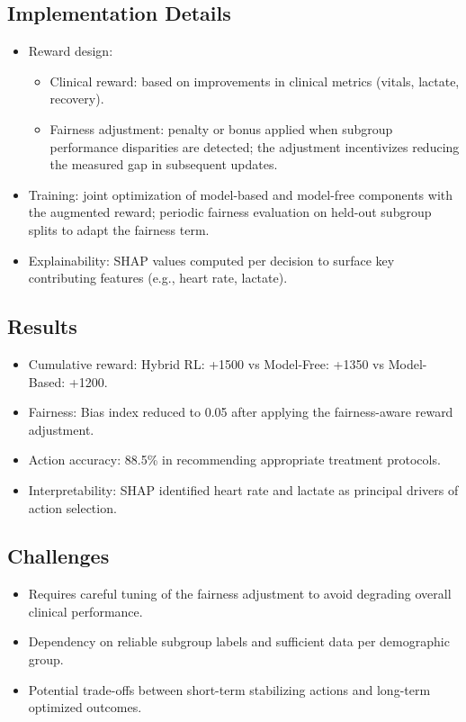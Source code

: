 \subsection*{Implementation Details}
\begin{itemize}
    \item Reward design:
    \begin{itemize}
        \item Clinical reward: based on improvements in clinical metrics (vitals, lactate, recovery).
        \item Fairness adjustment: penalty or bonus applied when subgroup performance disparities are detected; the adjustment incentivizes reducing the measured gap in subsequent updates.
    \end{itemize}
    \item Training: joint optimization of model-based and model-free components with the augmented reward; periodic fairness evaluation on held-out subgroup splits to adapt the fairness term.
    \item Explainability: SHAP values computed per decision to surface key contributing features (e.g., heart rate, lactate).
\end{itemize}

\subsection*{Results}
\begin{itemize}
    \item Cumulative reward: Hybrid RL: +1500 vs Model-Free: +1350 vs Model-Based: +1200.
    \item Fairness: Bias index reduced to 0.05 after applying the fairness-aware reward adjustment.
    \item Action accuracy: 88.5\% in recommending appropriate treatment protocols.
    \item Interpretability: SHAP identified heart rate and lactate as principal drivers of action selection.
\end{itemize}

\subsection*{Challenges}
\begin{itemize}
    \item Requires careful tuning of the fairness adjustment to avoid degrading overall clinical performance.
    \item Dependency on reliable subgroup labels and sufficient data per demographic group.
    \item Potential trade-offs between short-term stabilizing actions and long-term optimized outcomes.
\end{itemize}

